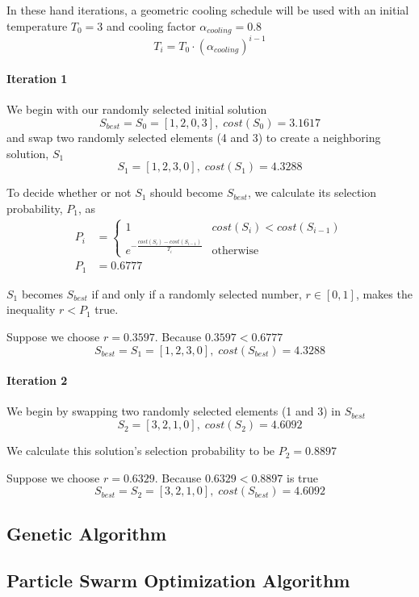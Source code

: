 \documentclass[a4paper]{article}
\newcommand{\subsubsubsection}[1]{\paragraph{#1} \mbox{}}
\begin{document}
In these hand iterations, a geometric cooling schedule will be used with an initial temperature $T_0 = 3$ and cooling factor $\alpha_\textit{cooling} = 0.8$
$$T_i = T_0 \cdot \left( \alpha_\textit{cooling} \right)^{i - 1}$$

\subsubsubsection{Iteration 1}

We begin with our randomly selected initial solution
$$S_\textit{best} = S_0 = [ 1, 2, 0, 3 ], \; \mathit{cost}(S_0) = 3.1617$$
and swap two randomly selected elements (4 and 3) to create a neighboring
solution, $S_1$
$$S_1 = [ 1, 2, 3, 0 ], \; \mathit{cost}(S_1) = 4.3288$$

To decide whether or not $S_1$ should become $S_\textit{best}$, we calculate its
selection probability, $P_1$, as %
\begin{align*}
P_i & =
\begin{cases}
  1 & \mathit{cost}(S_{i}) < \mathit{cost}(S_{i - 1}) \\
  e^{-\frac{\mathit{cost}(S_{i}) - \mathit{cost}(S_{i - 1})}{T_i}} & \text{otherwise}
\end{cases} \\
P_1 & = 0.6777
\end{align*}

$S_1$ becomes $S_\mathit{best}$ if and only if a randomly selected number,
$r \in [0, 1]$, makes the inequality $r < P_1$ true.

Suppose we choose $r = 0.3597$. Because $0.3597 < 0.6777$
$$S_\mathit{best} = S_1 = [ 1, 2, 3, 0 ], \; \mathit{cost}(S_\mathit{best}) = 4.3288$$

\subsubsubsection{Iteration 2}

We begin by swapping two randomly selected elements (1 and 3) in $S_\mathit{best}$
$$S_2 = [ 3, 2, 1, 0 ], \; \mathit{cost}(S_2) = 4.6092$$

We calculate this solution's selection probability to be $P_2 = 0.8897$

Suppose we choose $r = 0.6329$. Because $0.6329 < 0.8897$ is true
$$S_\mathit{best} = S_2 = [ 3, 2, 1, 0 ], \; \mathit{cost}(S_\mathit{best}) = 4.6092$$

\subsection{Genetic Algorithm} %

\subsection{Particle Swarm Optimization Algorithm} %
\end{document}
